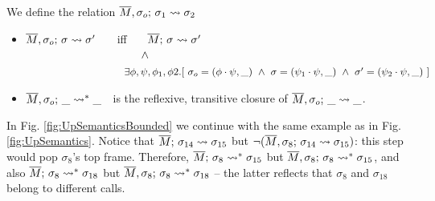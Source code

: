 {
\begin{definition}
\label{def:shallow:term}
We define the relation  $\leadstoBounded {\Mtwo} {\sigma_1} {\sigma_o} {\sigma_2}$ 

\begin{itemize}
\item
 $\leadstoBounded {\Mtwo} {\sigma} {\sigma_o}  {\sigma'}$ \ \ \ iff \ \ \  $\leadstoOrig {\Mtwo} {\sigma} {\sigma'}$\\
$\strut  \hspace{3.6cm} \wedge $\\
$\strut  \hspace{3.1cm}\ \    \exists \phi,\psi, \phi_1, \phi2.[ \ \sigma_o = (\phi\cdot\psi,\_) \ \wedge \ \sigma = (\psi_1\cdot \psi, \_)
\ \wedge\ \sigma' = (\psi_2\cdot \psi, \_)\ ] $ 
\item
 $\leadstoBoundedStar {\Mtwo}  {\_}  {\sigma_o} {\_}$\ \  is the reflexive, transitive closure of $\leadstoBounded {\Mtwo}  {\_}  {\sigma_o} {\_}$.
\end{itemize}
\end{definition}
}
 
 {In Fig. \ref{fig:UpSemanticsBounded} we continue with the same example as in  Fig. \ref{fig:UpSemantics}. Notice that $\leadstoOrig {\Mtwo} {\sigma_{14}}  {\sigma_{15}}$ 
 but    $\notLeadstoBounded  {\Mtwo}  {\sigma_{14}} {\sigma_8} {\sigma_{15}}$:  this step would pop  $\sigma_8$'s
 top frame. 
Therefore, 
 $\leadstoOrigStar {\Mtwo} {\sigma_8}  {\sigma_{15}}$ 
 but  $\notLeadstoBoundedStar {\Mtwo} {\sigma_8} {\sigma_8} {\sigma_{15}}$, and also
  $\leadstoOrigStar {\Mtwo} {\sigma_8}  {\sigma_{18}}$ 
 but  $\notLeadstoBoundedStar {\Mtwo} {\sigma_8} {\sigma_8} {\sigma_{18}}$  -- the latter reflects that $\sigma_8$ and $\sigma_{18}$ belong to different calls. 
}

